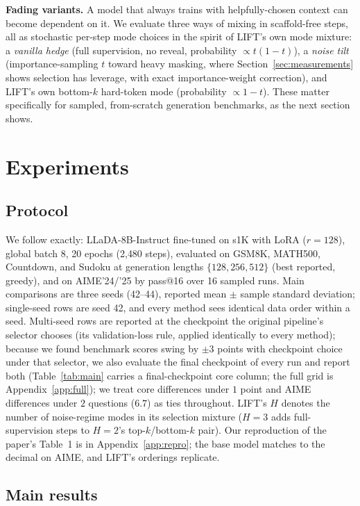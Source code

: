 \documentclass{article} %
\begin{document}
\textbf{Fading variants.} A model that always trains with helpfully-chosen context can become dependent on it. We evaluate three ways of mixing in scaffold-free steps, all as stochastic per-step mode choices in the spirit of LIFT's own mode mixture: a \emph{vanilla hedge} (full supervision, no reveal, probability $\propto t(1-t)$), a \emph{noise tilt} (importance-sampling $t$ toward heavy masking, where Section~\ref{sec:measurements} shows selection has leverage, with exact importance-weight correction), and LIFT's own bottom-$k$ hard-token mode (probability $\propto 1-t$). These matter specifically for sampled, from-scratch generation benchmarks, as the next section shows.

\section{Experiments}
\label{sec:experiments}

\subsection{Protocol}

We follow \citet{lift2026} exactly: LLaDA-8B-Instruct fine-tuned on s1K \citep{muennighoff2025s1} with LoRA ($r{=}128$), global batch 8, 20 epochs (2{,}480 steps), evaluated on GSM8K, MATH500, Countdown, and Sudoku at generation lengths $\{128, 256, 512\}$ (best reported, greedy), and on AIME'24/'25 by pass@16 over 16 sampled runs. Main comparisons are three seeds (42--44), reported mean $\pm$ sample standard deviation; single-seed rows are seed 42, and every method sees identical data order within a seed. Multi-seed rows are reported at the checkpoint the original pipeline's selector chooses (its validation-loss rule, applied identically to every method); because we found benchmark scores swing by $\pm 3$ points with checkpoint choice under that selector, we also evaluate the final checkpoint of every run and report both (Table~\ref{tab:main} carries a final-checkpoint core column; the full grid is Appendix~\ref{app:full}); we treat core differences under $1$ point and AIME differences under $2$ questions ($6.7$) as ties throughout. LIFT's $H$ denotes the number of noise-regime modes in its selection mixture ($H{=}3$ adds full-supervision steps to $H{=}2$'s top-$k$/bottom-$k$ pair). Our reproduction of the paper's Table~1 is in Appendix~\ref{app:repro}; the base model matches to the decimal on AIME, and LIFT's orderings replicate.

\subsection{Main results}
\end{document}
